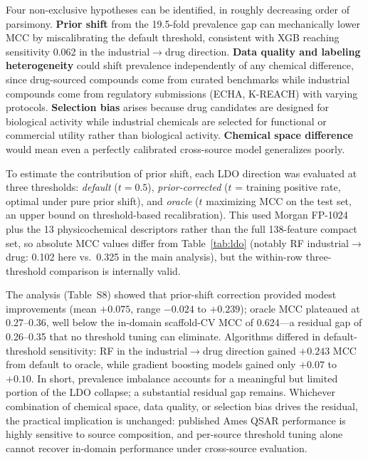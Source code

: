 Four non-exclusive hypotheses can be identified, in roughly decreasing order of parsimony.
\textbf{Prior shift} from the 19.5-fold prevalence gap can mechanically lower MCC by miscalibrating the default threshold,
consistent with XGB reaching sensitivity 0.062 in the industrial$\to$drug direction. \textbf{Data quality and labeling heterogeneity} could shift prevalence independently of any chemical difference,
since drug-sourced compounds come from curated benchmarks while industrial compounds come from regulatory submissions (ECHA, K-REACH) with varying protocols.
\textbf{Selection bias} arises because drug candidates are designed for biological activity while industrial chemicals are selected for functional or commercial utility rather than biological activity.
\textbf{Chemical space difference}\cite{Lipinski_2004,Veber_2002} would mean even a perfectly calibrated cross-source model generalizes poorly.

To estimate the contribution of prior shift, each LDO direction was evaluated at three thresholds: \textit{default} ($t = 0.5$), \textit{prior-corrected} ($t$ = training positive rate, optimal under pure prior shift),
and \textit{oracle} ($t$ maximizing MCC on the test set, an upper bound on threshold-based recalibration).
This used Morgan FP-1024 plus the 13 physicochemical descriptors rather than the full 138-feature compact set,
so absolute MCC values differ from Table~\ref{tab:ldo} (notably RF industrial$\to$drug: 0.102 here vs.\ 0.325 in the main analysis),
but the within-row three-threshold comparison is internally valid.

The analysis (Table~S8) showed that prior-shift correction provided modest improvements (mean $+0.075$, range $-0.024$ to $+0.239$);
oracle MCC plateaued at 0.27--0.36, well below the in-domain scaffold-CV MCC of 0.624---a residual gap of 0.26--0.35 that no threshold tuning can eliminate.
Algorithms differed in default-threshold sensitivity: RF in the industrial$\to$drug direction gained $+0.243$ MCC from default to oracle,
while gradient boosting models gained only $+0.07$ to $+0.10$. In short, prevalence imbalance accounts for a meaningful but limited portion of the LDO collapse; a substantial residual gap remains.
Whichever combination of chemical space, data quality, or selection bias drives the residual, the practical implication is unchanged: published Ames QSAR performance is highly sensitive to source composition,
and per-source threshold tuning alone cannot recover in-domain performance under cross-source evaluation.

